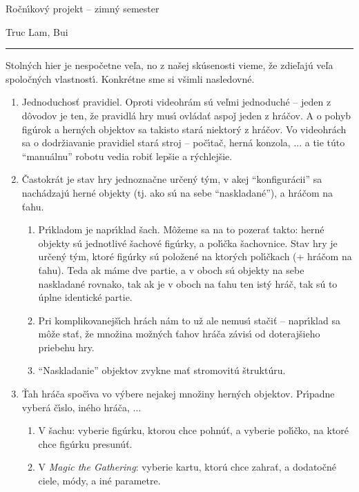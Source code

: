 \documentclass[a4paper,12pt]{article}
\def\header#1#2{%
\centerline{\Large\sc Ro\v{c}n\'{\i}kov\'{y} projekt -- #1}
\medskip
\centerline{\large #2}
\vspace{-\baselineskip}\rightline{\today}
\bigskip\hrule\bigskip

}
\begin{document}
\header{zimn\'{y} semester}{Truc Lam, Bui}

Stoln\'{y}ch hier je nespo\v{c}etne ve\v{l}a, no z na\v{s}ej
sk\'{u}senosti vieme, \v{z}e zdie\v{l}aj\'{u} ve\v{l}a spolo\v{c}n\'{y}ch
vlastnost\'{\i}. Konkr\'{e}tne sme si v\v{s}imli nasledovn\'{e}.

\begin{enumerate}
    \item Jednoduchos\v{t} pravidiel. Oproti videohr\'{a}m s\'{u}
    ve\v{l}mi jednoduch\'{e} -- jeden z d\^{o}vodov je ten, \v{z}e pravidl\'{a} hry mus\'{\i}
    ovl\'{a}da\v{t} aspo\v{j} jeden z hr\'{a}\v{c}ov. A o pohyb fig\'{u}rok
    a hern\'{y}ch objektov sa takisto star\'{a} niektor\'{y} z hr\'{a}\v{c}ov.
    Vo videohr\'{a}ch sa o dodr\v{z}iavanie pravidiel star\'{a} stroj
    -- po\v{c}\'{\i}ta\v{c}, hern\'{a} konzola, ... a tie t\'{u}to
    ``manu\'{a}lnu'' robotu vedia robi\v{t} lep\v{s}ie a r\'{y}chlej\v{s}ie.
    \item \v{C}astokr\'{a}t je stav hry jednozna\v{c}ne ur\v{c}en\'{y}
    t\'{y}m, v akej ``konfigur\'{a}cii'' sa nach\'{a}dzaj\'{u} hern\'{e}
    objekty (tj. ako s\'{u} na sebe ``naskladan\'{e}''), a hr\'{a}\v{c}om
    na \v{t}ahu.
    \begin{enumerate}
        \item Pr\'{\i}kladom je napr\'{\i}klad \v{s}ach. M\^{o}\v{z}eme
        sa na to pozera\v{t} takto: hern\'{e} objekty s\'{u} jednotliv\'{e}
        \v{s}achov\'{e} fig\'{u}rky, a pol\'{\i}\v{c}ka \v{s}achovnice.
        Stav hry je ur\v{c}en\'{y} t\'{y}m, ktor\'{e} fig\'{u}rky s\'{u}
        polo\v{z}en\'{e} na ktor\'{y}ch pol\'{\i}\v{c}kach (+ hr\'{a}\v{c}om
        na \v{t}ahu). Teda ak m\'{a}me dve partie, a v oboch s\'{u} objekty
        na sebe naskladan\'{e} rovnako, tak ak je v oboch na \v{t}ahu
        ten ist\'{y} hr\'{a}\v{c}, tak s\'{u} to \'{u}plne identick\'{e}
        partie.
        \item Pri komplikovanej\v{s}\'{\i}ch hr\'{a}ch n\'{a}m to u\v{z}
        ale nemus\'{\i} sta\v{c}i\v{t} -- napr\'{\i}klad sa m\^{o}\v{z}e
        sta\v{t}, \v{z}e mno\v{z}ina mo\v{z}n\'{y}ch \v{t}ahov
        hr\'{a}\v{c}a z\'{a}vis\'{\i} od doteraj\v{s}ieho priebehu hry.
        \item ``Naskladanie'' objektov zvykne ma\v{t} stromovit\'{u}
        \v{s}trukt\'{u}ru.
    \end{enumerate}
    \item \v{T}ah hr\'{a}\v{c}a spo\v{c}\'{\i}va vo
    v\'{y}bere nejakej mno\v{z}iny hern\'{y}ch objektov. Pr\'{\i}padne
    vyber\'{a} \v{c}\'{\i}slo, in\'{e}ho hr\'{a}\v{c}a, ...
    \begin{enumerate}
        \item V \v{s}achu: vyberie fig\'{u}rku, ktorou chce pohn\'{u}\v{t},
        a vyberie pol\'{\i}\v{c}ko, na ktor\'{e} chce fig\'{u}rku
        presun\'{u}\v{t}.
        \item V \emph{Magic the Gathering}: vyberie kartu, ktor\'{u}
        chce zahra\v{t}, a dodato\v{c}n\'{e} ciele, m\'{o}dy, a in\'{e}
        parametre.
    \end{enumerate}
\end{enumerate}
\end{document}
